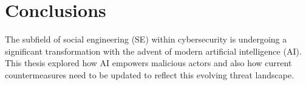 



\chapter{Conclusions\label{chapter:conclusions}}

\begin{comment}

Guides:
    - As many pages as it takes (thesis max is around 20 pages)

TODO:
    [ ] How AI has augmented SE attacks and countermeasures
    [ ] Gap in the literature

What to cover:
    - How AI has augmented SE attacks and countermeasures
    - Gap in the literature regarding SE and AI intersection?
    - Analysis on where AI-powered SE attacks might be headed in the future
        - Also about robotics and human-like actors
    - What organizations and individuals need to do regarding the evolving landscape of SE attacks

Speculation:
    - Drones dropping USB thumbdrives?
    - Human-like android as threat actors
    - Impact of robotics on dumpster diving, shoulder surfing and baiting
    
Literature:
    - Gen and detection of deepfakes

From training material:
    - Yhteenveto vaatimattomimmillaan on vain lyhyt kertaus kirjoituksen keskeisistä asioista. Arvokkaamman yhteenvedon saa aikaan kommentoimalla työn tulosten arvoa, työn liittymistä ympäristöön ja tulevaisuudennäkymiä. Tällaiset arviot huolellisesti perusteltava.

\end{comment}

The subfield of social engineering (SE) within cybersecurity is undergoing a significant transformation with the advent of modern artificial intelligence (AI). This thesis explored how AI empowers malicious actors and also how current countermeasures need to be updated to reflect this evolving threat landscape.





